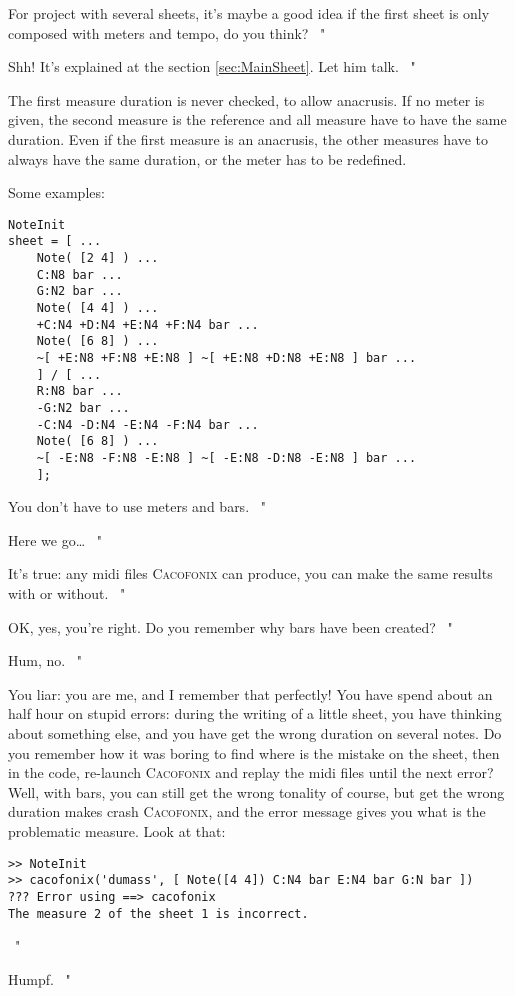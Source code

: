 \documentclass{article}
\newcommand\cacofonix{\textsc{Cacofonix}\xspace}
\newenvironment{meenv}{ \par \noindent \makebox[6em][r]{ \textcolor{mecolor}{Me}: " --~}}{~"}
\newenvironment{myselfenv}{ \par \noindent \makebox[6em][r]{ \textcolor{myselfcolor}{Myself}: " --~}}{~"}
\newcommand{ \me }[1]{%
\begin{meenv}%
	#1%
\end{meenv} }
\newcommand{ \myself }[1]{%
\begin{myselfenv}%
	#1%
\end{myselfenv} }
\begin{document}
\me{ For project with several sheets, it's maybe a good idea if the first sheet is only composed with meters and tempo, do you think? }
\myself{ Shh! It's explained at the section \ref{sec:MainSheet}. Let him talk. }

The first measure duration is never checked, to allow anacrusis. If no meter is given, the second measure is the reference and all measure have to have the same duration. Even if the first measure is an anacrusis, the other measures have to always have the same duration, or the meter has to be redefined.

Some examples: \\

\begin{lstlisting}
NoteInit
sheet = [ ...
	Note( [2 4] ) ...
	C:N8 bar ...
	G:N2 bar ...
	Note( [4 4] ) ...
	+C:N4 +D:N4 +E:N4 +F:N4 bar ...
	Note( [6 8] ) ...
	~[ +E:N8 +F:N8 +E:N8 ] ~[ +E:N8 +D:N8 +E:N8 ] bar ...
	] / [ ...
	R:N8 bar ...
	-G:N2 bar ...
	-C:N4 -D:N4 -E:N4 -F:N4 bar ...
	Note( [6 8] ) ...
	~[ -E:N8 -F:N8 -E:N8 ] ~[ -E:N8 -D:N8 -E:N8 ] bar ...
	];
\end{lstlisting}

\me{ You don't have to use meters and bars. }
\myself{ Here we go\dots }
\me{ It's true: any midi files \cacofonix can produce, you can make the same results with or without. }
\myself{ OK, yes, you're right. Do you remember why bars have been created? }
\me{ Hum, no. }
\begin{myselfenv}
You liar: you are me, and I remember that perfectly! You have spend about an half hour on stupid errors: during the writing of a little sheet, you have thinking about something else, and you have get the wrong duration on several notes. Do you remember how it was boring to find where is the mistake on the sheet, then in the code, re-launch \cacofonix and replay the midi files until the next error? Well, with bars, you can still get the wrong tonality of course, but get the wrong duration makes crash \cacofonix, and the error message gives you what is the problematic measure. Look at that:
\begin{lstlisting}
>> NoteInit
>> cacofonix('dumass', [ Note([4 4]) C:N4 bar E:N4 bar G:N bar ])
??? Error using ==> cacofonix
The measure 2 of the sheet 1 is incorrect.
\end{lstlisting}
\end{myselfenv}
\me{ Humpf. }
\end{document}
